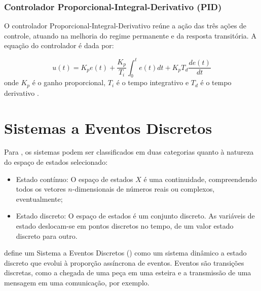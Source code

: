 \subsubsection{Controlador Proporcional-Integral-Derivativo (PID)}

O controlador Proporcional-Integral-Derivativo reúne a ação das três ações de controle, atuando na melhoria do 
regime permanente e da resposta transitória. 
A equação do controlador é dada por:

\begin{equation}
 u(t) = K_pe(t) + \frac{K_p}{T_i}\int_{0}^{t}e(t)dt + K_pT_d\frac{de(t)}{dt}
\end{equation}
onde  $K_p$ é o ganho proporcional, $T_i$ é o tempo integrativo e $T_d$ é o tempo derivativo \cite{ogata}.


%
%


\vspace{1cm}
\section{Sistemas a Eventos Discretos} \label{cap:sed}


Para , os sistemas podem ser classificados em duas categorias quanto à natureza do espaço de estados 
selecionado: 
\begin{itemize}
 \item Estado contínuo: O espaço de estados $X$ é uma continuidade, compreendendo todos os vetores $n$-dimensionais de números reais ou 
 complexos, eventualmente;
 
 \item Estado discreto: O espaço de estados é um conjunto discreto. As variáveis de estado deslocam-se em pontos discretos no tempo, de 
 um valor estado discreto para outro.
\end{itemize}

 define um Sistema a Eventos Discretos () 
como um sistema dinâmico a estado discreto que evolui à proporção assíncrona de eventos. %
Eventos são transições discretas, como a chegada de uma peça em uma esteira e a transmissão de uma mensagem em uma comunicação, por 
exemplo.

